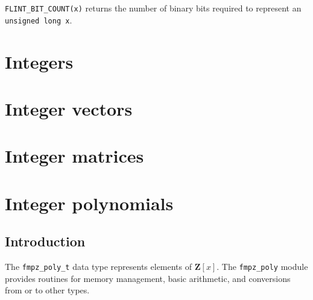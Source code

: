 \documentclass[a4paper,10pt]{book}
\newcommand{\Z}{\mathbf{Z}}%
\newcommand{\code}{\lstinline}
\begin{document}
\code{FLINT_BIT_COUNT(x)} returns the number of binary bits required 
to represent an \code{unsigned long x}.


\chapter{Integers}




\chapter{Integer vectors}




\chapter{Integer matrices}




\chapter{Integer polynomials}

\section{Introduction}

The \code{fmpz_poly_t} data type represents elements of $\Z[x]$. The 
\code{fmpz_poly} module provides routines for memory management, basic 
arithmetic, and conversions from or to other types.
\end{document}
